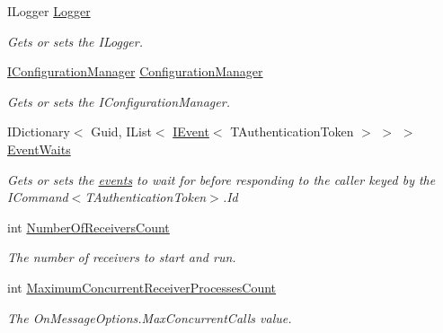 \begin{DoxyCompactItemize}
I\+Logger \hyperlink{classCqrs_1_1Azure_1_1ServiceBus_1_1AzureBus_ad9bfb86c6f7724ce0729d45ddad4fbf5_ad9bfb86c6f7724ce0729d45ddad4fbf5}{Logger}
\begin{DoxyCompactList}\small\item\em Gets or sets the I\+Logger. \end{DoxyCompactList}\item 
\hyperlink{interfaceCqrs_1_1Configuration_1_1IConfigurationManager}{I\+Configuration\+Manager} \hyperlink{classCqrs_1_1Azure_1_1ServiceBus_1_1AzureBus_aaf9469d220fb23cb0521fa76b25ab228_aaf9469d220fb23cb0521fa76b25ab228}{Configuration\+Manager}
\begin{DoxyCompactList}\small\item\em Gets or sets the I\+Configuration\+Manager. \end{DoxyCompactList}\item 
I\+Dictionary$<$ Guid, I\+List$<$ \hyperlink{interfaceCqrs_1_1Events_1_1IEvent}{I\+Event}$<$ T\+Authentication\+Token $>$ $>$ $>$ \hyperlink{classCqrs_1_1Azure_1_1ServiceBus_1_1AzureBus_ae3c0fd5566add5441bb70b48eceb98be_ae3c0fd5566add5441bb70b48eceb98be}{Event\+Waits}
\begin{DoxyCompactList}\small\item\em Gets or sets the \hyperlink{}{events} to wait for before responding to the caller keyed by the I\+Command$<$\+T\+Authentication\+Token$>$.\+Id \end{DoxyCompactList}\item 
int \hyperlink{classCqrs_1_1Azure_1_1ServiceBus_1_1AzureBus_a65ca2b61bf8f2dba9d0e0f54ec64c2b9_a65ca2b61bf8f2dba9d0e0f54ec64c2b9}{Number\+Of\+Receivers\+Count}
\begin{DoxyCompactList}\small\item\em The number of receivers to start and run. \end{DoxyCompactList}\item 
int \hyperlink{classCqrs_1_1Azure_1_1ServiceBus_1_1AzureBus_a6b517888d91c6a5b026cb5857e75a04f_a6b517888d91c6a5b026cb5857e75a04f}{Maximum\+Concurrent\+Receiver\+Processes\+Count}
\begin{DoxyCompactList}\small\item\em The On\+Message\+Options.\+Max\+Concurrent\+Calls value. \end{DoxyCompactList}\item 

\end{DoxyCompactItemize}
